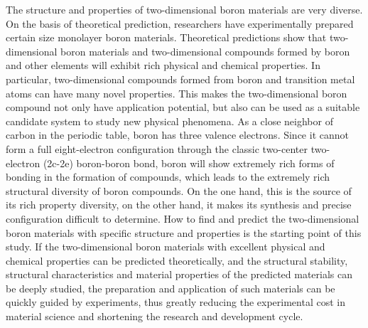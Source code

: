 \documentclass[phd,nobackinfo]{scutthesis}
\begin{document}
\begin{englishabstract}
The structure and properties of two-dimensional boron materials are very diverse. On the basis of theoretical prediction, researchers have experimentally prepared certain size monolayer boron materials.
Theoretical predictions show that two-dimensional boron materials and two-dimensional compounds formed by boron and other elements will exhibit rich physical and chemical properties.
In particular, two-dimensional compounds formed from boron and transition metal atoms can have many novel properties. This makes the two-dimensional boron compound not only have application potential, but also can be used as a suitable candidate system to study new physical phenomena.
As a close neighbor of carbon in the periodic table, boron has three valence electrons. Since it cannot form a full eight-electron configuration through the classic two-center two-electron (2c-2e) boron-boron bond, boron will show extremely rich forms of bonding in the formation of compounds, which leads to the extremely rich structural diversity of boron compounds.
On the one hand, this is the source of its rich property diversity, on the other hand, it makes its synthesis and precise configuration difficult to determine.
How to find and predict the two-dimensional boron materials with specific structure and properties is the starting point of this study.
If the two-dimensional boron materials with excellent physical and chemical properties can be predicted theoretically, and the structural stability, structural characteristics and material properties of the predicted materials can be deeply studied, the preparation and application of such materials can be quickly guided by experiments, thus greatly reducing the experimental cost in material science and shortening the research and development cycle.


\end{englishabstract}
\end{document}
